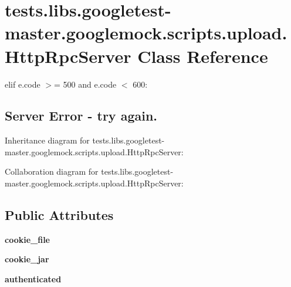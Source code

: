 \hypertarget{classtests_1_1libs_1_1googletest-master_1_1googlemock_1_1scripts_1_1upload_1_1HttpRpcServer}{}\section{tests.\+libs.\+googletest-\/master.googlemock.\+scripts.\+upload.\+Http\+Rpc\+Server Class Reference}
\label{classtests_1_1libs_1_1googletest-master_1_1googlemock_1_1scripts_1_1upload_1_1HttpRpcServer}


elif e.\+code $>$= 500 and e.\+code $<$ 600\+: \subsection*{Server Error -\/ try again.} 




Inheritance diagram for tests.\+libs.\+googletest-\/master.googlemock.\+scripts.\+upload.\+Http\+Rpc\+Server\+:


Collaboration diagram for tests.\+libs.\+googletest-\/master.googlemock.\+scripts.\+upload.\+Http\+Rpc\+Server\+:
\subsection*{Public Attributes}
\begin{DoxyCompactItemize}
\item 
\mbox{\label{classtests_1_1libs_1_1googletest-master_1_1googlemock_1_1scripts_1_1upload_1_1HttpRpcServer_a7c2032d8f26cd78e9e2179a520bec74f}} 
{\bfseries cookie\+\_\+file}
\item 
\mbox{\label{classtests_1_1libs_1_1googletest-master_1_1googlemock_1_1scripts_1_1upload_1_1HttpRpcServer_a74cd882c535cfed49e2c4ffd05b40e26}} 
{\bfseries cookie\+\_\+jar}
\item 
\mbox{\label{classtests_1_1libs_1_1googletest-master_1_1googlemock_1_1scripts_1_1upload_1_1HttpRpcServer_a3638f9d4d2323dd8ca9bf5911aaea24a}} 
{\bfseries authenticated}
\end{DoxyCompactItemize}
